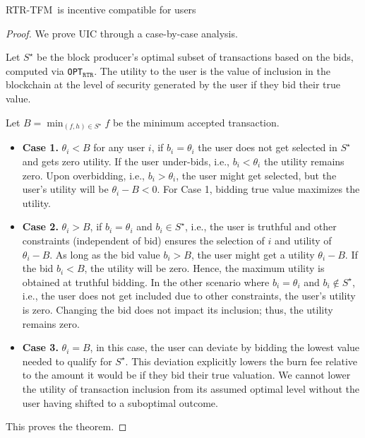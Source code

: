 \documentclass[sigconf,anonymous]{aamas}
\newcommand{\ourTFM}{\textsc{RTR-TFM}}
\newcommand{\ourOPT}{\texttt{OPT$_{\texttt{RTR}}$}}
\begin{document}
\begin{theorem}\label{thm:UIC}
   \ourTFM\ is incentive compatible for users
\end{theorem}
\begin{proof}

    We prove UIC through a case-by-case analysis.

    Let $S^\star$ be the block producer's optimal subset of transactions based on the bids, computed via \ourOPT. The utility to the user is the value of inclusion in the blockchain at the level of security generated by the user if they bid their true value.

    Let $B = \min_{(f, h)\in S^\star} f$ be the minimum accepted transaction.

    \begin{itemize}[leftmargin=*]

        \item \textbf{Case 1.} $\theta_i < B$ for any user $i$, if $b_i = \theta_i$ the user does not get selected in $S^\star$ and gets zero utility. If the user under-bids, i.e., $b_i < \theta_i$ the utility remains zero. Upon overbidding, i.e., $b_i > \theta_i$, the user might get selected, but the user's utility will be $\theta_i - B < 0$. For Case 1, bidding true value maximizes the utility.

        \item \textbf{Case 2.} $\theta_i > B$, if $b_i = \theta_i$ and $b_i \in S^\star$, i.e., the user is truthful and other constraints (independent of bid) ensures the selection of $i$ and utility of $\theta_i - B$. As long as the bid value $b_i > B$, the user might get a utility $\theta_i - B$. If the bid $b_i < B$, the utility will be zero. Hence, the maximum utility is obtained at truthful bidding. In the other scenario where $b_i = \theta_i$ and $b_i \not\in S^\star$, i.e., the user does not get included due to other constraints, the user's utility is zero. Changing the bid does not impact its inclusion; thus, the utility remains zero.

        \item \textbf{Case 3.} $\theta_i = B$, in this case, the user can deviate by bidding the lowest value needed to qualify for $S^\star$. This deviation explicitly lowers the burn fee relative to the amount it would be if they bid their true valuation. We cannot lower the utility of transaction inclusion from its assumed optimal level without the user having shifted to a suboptimal outcome.
    \end{itemize}
    This proves the theorem.
\end{proof}
\end{document}
